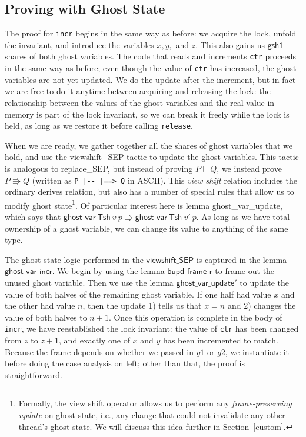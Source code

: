 \documentclass[11pt]{article}
\begin{document}
\subsection{Proving with Ghost State}
The proof for \texttt{incr} begins in the same way as before: we acquire the lock, unfold the invariant, and introduce the variables $x, y,$ and $z$. This also gains us $\mathsf{gsh1}$ shares of both ghost variables. The code that reads and increments \texttt{ctr} proceeds in the same way as before; even though the value of \texttt{ctr} has increased, the ghost variables are not yet updated. We do the update after the increment, but in fact we are free to do it anytime between acquiring and releasing the lock: the relationship between the values of the ghost variables and the real value in memory is part of the lock invariant, so we can break it freely while the lock is held, as long as we restore it before calling \texttt{release}.

When we are ready, we gather together all the shares of ghost variables that we hold, and use the \textsf{viewshift\_SEP} tactic to update the ghost variables. This tactic is analogous to \textsf{replace\_SEP}, but instead of proving $P \vdash Q$, we instead prove $P \Rrightarrow Q$ (written as \verb+P |-- |==> Q+ in ASCII). This \emph{view shift} relation includes the ordinary derives relation, but also has a number of special rules that allow us to modify ghost state\footnote{Formally, the view shift operator allows us to perform any \emph{frame-preserving update} on ghost state, i.e., any change that could not invalidate any other thread's ghost state. We will discuss this idea further in Section~\ref{custom}.}. Of particular interest here is lemma \textsf{ghost\_var\_update}, which says that $\mathsf{ghost\_var}\ \mathsf{Tsh}\ v\ p \Rrightarrow \mathsf{ghost\_var}\ \mathsf{Tsh}\ v'\ p$. As long as we have total ownership of a ghost variable, we can change its value to anything of the same type.

The ghost state logic performed in the $\mathsf{viewshift\_SEP}$ is captured in the lemma $\mathsf{ghost\_var\_incr}$. We begin by using the lemma $\mathsf{bupd\_frame\_r}$ to frame out the unused ghost variable. Then we use the lemma $\mathsf{ghost\_var\_update'}$ to update the value of both halves of the remaining ghost variable. If one half had value $x$ and the other had value $n$, then the update 1) tells us that $x = n$ and 2) changes the value of both halves to $n + 1$.
Once this operation is complete in the body of \texttt{incr}, we have reestablished the lock invariant: the value of \texttt{ctr} has been changed from $z$ to $z + 1$, and exactly one of $x$ and $y$ has been incremented to match. Because the frame depends on whether we passed in $g1$ or $g2$, we instantiate it before doing the case analysis on \textsf{left}; other than that, the proof is straightforward.
\end{document}
